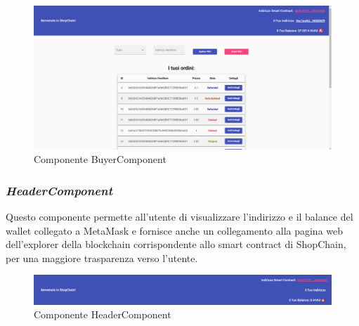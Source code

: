 \begin{figure}[!h] 
    \centering 
    \includegraphics[width=1\columnwidth]{immagini/maschere/homepage.png} 
    \caption{Componente BuyerComponent}
\end{figure}

\subsubsection*{\textit{HeaderComponent}}
\label{sec:header-component}
Questo componente permette all'utente di visualizzare l'indirizzo e il balance del wallet collegato a MetaMask e fornisce anche un collegamento alla pagina web dell'explorer della blockchain corrispondente allo smart contract di ShopChain, per una maggiore trasparenza verso l'utente.

\begin{figure}[!h] 
    \centering 
    \includegraphics[width=1\columnwidth]{immagini/componenti/header.png} 
    \caption{Componente HeaderComponent}
\end{figure}